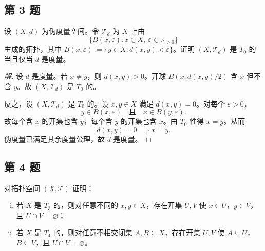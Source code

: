 \documentclass[11pt,a4paper]{article}
\newcommand{\R}{\mathbb{R}}
\theoremstyle{definition}
\newenvironment{solution}{\begin{proof}[解]}{\end{proof}}
\begin{document}
\subsection{第 3 题}

设 $(X, d)$ 为伪度量空间。令 $\mathcal{T}_d$ 为 $X$ 上由
\[
  \{B(x,\varepsilon) : x \in X,\ \varepsilon \in \R_{>0}\}
\]
生成的拓扑，其中 $B(x,\varepsilon) := \{y \in X : d(x,y) < \varepsilon\}$。证明 $(X, \mathcal{T}_d)$ 是 $T_0$ 的当且仅当 $d$ 是度量。

\begin{solution}
设 $d$ 是度量。若 $x \ne y$，则 $d(x,y) > 0$。开球 $B(x, d(x,y)/2)$ 含 $x$ 但不含 $y$。故 $(X, \mathcal{T}_d)$ 是 $T_0$ 的。

反之，设 $(X, \mathcal{T}_d)$ 是 $T_0$ 的。设 $x, y \in X$ 满足 $d(x,y) = 0$。对每个 $\varepsilon > 0$，
\[
  y \in B(x,\varepsilon) \quad \text{且} \quad x \in B(y,\varepsilon).
\]
故每个含 $x$ 的开集也含 $y$，每个含 $y$ 的开集也含 $x$。由 $T_0$ 性得 $x = y$。从而
\[
  d(x,y) = 0 \implies x = y.
\]
伪度量已满足其余度量公理，故 $d$ 是度量。
\end{solution}

\subsection{第 4 题}

对拓扑空间 $(X, \mathcal{T})$ 证明：
\begin{enumerate}[(i)]
  \item 若 $X$ 是 $T_3$ 的，则对任意不同的 $x, y \in X$，存在开集 $U, V$ 使 $x \in U$，$y \in V$，且 $\overline{U} \cap \overline{V} = \varnothing$；
  \item 若 $X$ 是 $T_4$ 的，则对任意不相交闭集 $A, B \subseteq X$，存在开集 $U, V$ 使 $A \subseteq U$，$B \subseteq V$，且 $\overline{U} \cap \overline{V} = \varnothing$。
\end{enumerate}
\end{document}
